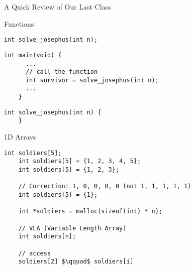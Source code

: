 \begin{frame}{}
  \centerline{\LARGE A Quick Review of Our Last Class}
\end{frame}

\begin{frame}[fragile]{Functions}
  \begin{lstlisting}[style = Cstyle]
    int solve_josephus(int n);
  \end{lstlisting}

  \vspace{0.20cm}
  \begin{lstlisting}[style = Cstyle]
    int main(void) {
      ...
      // call the function
      int survivor = solve_josephus(int n);
      ...
    }
  \end{lstlisting}

  \vspace{0.20cm}
  \begin{lstlisting}[style = Cstyle]
    int solve_josephus(int n) {
    }
  \end{lstlisting}
\end{frame}

\begin{frame}[fragile]{1D Arrays}
  \begin{lstlisting}[style = Cstyle]
    int soldiers[5];
    int soldiers[5] = {1, 2, 3, 4, 5};
    int soldiers[5] = {1, 2, 3};
    
    // Correction: 1, 0, 0, 0, 0 (not 1, 1, 1, 1, 1)
    int soldiers[5] = {1};

    int *soldiers = malloc(sizeof(int) * n);

    // VLA (Variable Length Array)
    int soldiers[n];

    // access
    soldiers[2] $\qquad$ soldiers[i]
  \end{lstlisting}
\end{frame}
